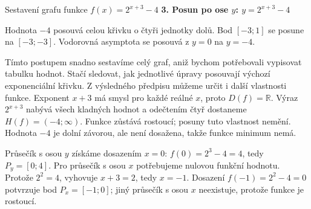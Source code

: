 \documentclass[12pt,a4paper]{article}
\begin{document}
\begin{examplebox}{Sestavení grafu funkce $f(x)=2^{x+3}-4$}
\textbf{3. Posun po ose $y$: $y=2^{x+3}-4$}

Hodnota $-4$ posouvá celou křivku o čtyři jednotky dolů.
Bod $[-3;1]$ se posune na $[-3;-3]$.
Vodorovná asymptota se posouvá z $y=0$ na \textbf{$y=-4$}.

\begin{center}
\end{center}


Tímto postupem snadno sestavíme celý graf, aniž bychom potřebovali vypisovat tabulku hodnot.
Stačí sledovat, jak jednotlivé úpravy posouvají výchozí exponenciální křivku.
Z výsledného předpisu můžeme určit i další vlastnosti funkce.
Exponent $x+3$ má smysl pro každé reálné $x$, proto $D(f)=\mathbb{R}$.
Výraz $2^{x+3}$ nabývá všech kladných hodnot a odečtením čtyř dostaneme $H(f)=(-4;\infty)$.
Funkce zůstává rostoucí; posuny tuto vlastnost nemění.
Hodnota $-4$ je dolní závorou, ale není dosažena, takže funkce minimum nemá.

Průsečík s osou $y$ získáme dosazením $x=0$: $f(0)=2^3-4=4$, tedy $P_y=[0;4]$.
Pro průsečík s osou $x$ potřebujeme nulovou funkční hodnotu.
Protože $2^2=4$, vyhovuje $x+3=2$, tedy $x=-1$.
Dosazení $f(-1)=2^2-4=0$ potvrzuje bod $P_x=[-1;0]$;
jiný průsečík s osou $x$ neexistuje, protože funkce je rostoucí.

\end{examplebox}
\end{document}
